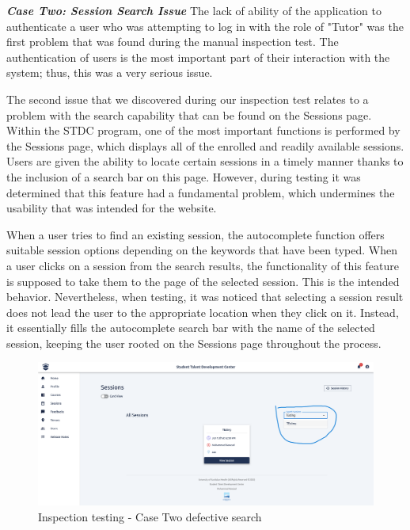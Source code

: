\begin{justify}
    
    \vspace{0.25cm}
    \newendline \textbf{\textit{Case Two: Session Search Issue}}\newendline
    The lack of ability of the application to authenticate a user who was attempting to log in with the role of "Tutor" was the first problem that was found during the manual inspection test. The authentication of users is the most important part of their interaction with the system; thus, this was a very serious issue.

    \vspace{0.25cm}
    \newendline The second issue that we discovered during our inspection test relates to a problem with the search capability that can be found on the Sessions page. Within the STDC program, one of the most important functions is performed by the Sessions page, which displays all of the enrolled and readily available sessions. Users are given the ability to locate certain sessions in a timely manner thanks to the inclusion of a search bar on this page. However, during testing it was determined that this feature had a fundamental problem, which undermines the usability that was intended for the website.

    \vspace{0.25cm}
    \newendline When a user tries to find an existing session, the autocomplete function offers suitable session options depending on the keywords that have been typed. When a user clicks on a session from the search results, the functionality of this feature is supposed to take them to the page of the selected session. This is the intended behavior. Nevertheless, when testing, it was noticed that selecting a session result does not lead the user to the appropriate location when they click on it. Instead, it essentially fills the autocomplete search bar with the name of the selected session, keeping the user rooted on the Sessions page throughout the process.

    \begin{figure}[H]
        \centerline{\includegraphics[width=150mm,scale=1]{figures/implementation_and_testing/testing/MIS/search.png}}
        \caption{Inspection testing - Case Two defective search}
        \label{Inspection_search}
    \end{figure}


\end{justify}
